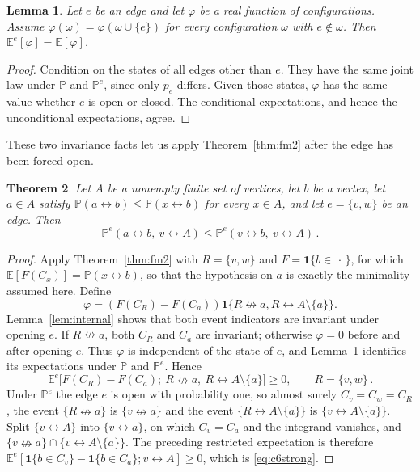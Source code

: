 \documentclass[11pt]{article}
\newtheorem{theorem}{Theorem}[section]
\newtheorem{lemma}[theorem]{Lemma}
\theoremstyle{definition}
\theoremstyle{remark}
\newcommand{\PP}{\mathbb P}
\newcommand{\EE}{\mathbb E}
\newcommand{\one}{\mathbf 1}
\newcommand{\con}{\leftrightarrow}
\newcommand{\ncon}{\nleftrightarrow}
\begin{document}
\begin{lemma}\label{lem:force}
Let $e$ be an edge and let $\varphi$ be a real function of configurations. Assume
$\varphi(\omega)=\varphi(\omega\cup\{e\})$ for every configuration $\omega$ with
$e\notin\omega$. Then $\EE^e[\varphi]=\EE[\varphi]$.
\end{lemma}

\begin{proof}
Condition on the states of all edges other than $e$. They have the same joint law under
$\PP$ and $\PP^e$, since only $p_e$ differs. Given those states, $\varphi$ has the same
value whether $e$ is open or closed. The conditional expectations, and hence the
unconditional expectations, agree.
\end{proof}

These two invariance facts let us apply Theorem~\ref{thm:fm2} after the edge has been
forced open.

\begin{theorem}\label{thm:c6strong}
Let $A$ be a nonempty finite set of vertices, let $b$ be a vertex, let $a\in A$ satisfy
$\PP(a\con b)\leq\PP(x\con b)$ for every $x\in A$, and let $e=\{v,w\}$ be an edge. Then
\begin{equation}\label{eq:c6strong}
 \PP^e(a\con b,\ v\con A)\leq \PP^e(v\con b,\ v\con A)\,.
\end{equation}
\end{theorem}

\begin{proof}
Apply Theorem~\ref{thm:fm2} with $R=\{v,w\}$ and $F=\one\{b\in\,\cdot\,\}$, for which
$\EE[F(C_x)]=\PP(x\con b)$, so that the hypothesis on $a$ is exactly the minimality assumed
here. Define
\[
 \varphi=(F(C_R)-F(C_a))\one\{R\ncon a,R\con A\setminus\{a\}\}.
\]
Lemma~\ref{lem:internal} shows that both event indicators are invariant under opening $e$.
If $R\ncon a$, both $C_R$ and $C_a$ are invariant; otherwise $\varphi=0$ before and after
opening $e$. Thus $\varphi$ is independent of the state of $e$, and Lemma~\ref{lem:force}
identifies its expectations under $\PP$ and $\PP^e$. Hence
\[
 \EE^e\bigl[F(C_R)-F(C_a);\ R\ncon a,\ R\con A\setminus\{a\}\bigr]\geq 0,\qquad R=\{v,w\}\,.
\]
Under $\PP^e$ the edge $e$ is open with probability one, so almost surely $C_v=C_w=C_R$,
the event $\{R\ncon a\}$ is $\{v\ncon a\}$ and the event $\{R\con A\setminus\{a\}\}$ is
$\{v\con A\setminus\{a\}\}$. Split $\{v\con A\}$ into $\{v\con a\}$, on which $C_v=C_a$ and
the integrand vanishes, and $\{v\ncon a\}\cap\{v\con A\setminus\{a\}\}$. The preceding
restricted expectation is therefore
$\EE^e[\one\{b\in C_v\}-\one\{b\in C_a\};v\con A]\geq0$, which is
\eqref{eq:c6strong}.
\end{proof}
\end{document}
